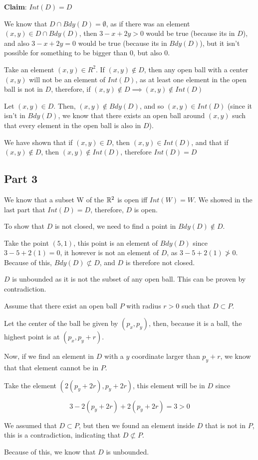 \documentclass[12pt]{article} %
\begin{document}
\begin{homeworkProblem}
    \textbf{Claim}: $Int(D) = D$



    We know that $D \cap Bdy(D) = \emptyset$, as if there was an element $(x, y) \in D \cap Bdy(D)$, then
    $3 - x + 2y > 0$ would be true (because its in $D$), and also $3 - x + 2y = 0$ would be true (because its in $Bdy(D)$),
    but it isn't possible for something to be bigger than 0, but also 0.

    Take an element $(x, y) \in R^2$. If $(x, y) \not \in D$, then any open ball
    with a center $(x, y)$ will not be an element of $Int(D)$, as at least one element in the open ball
    is not in $D$, therefore, if $(x, y) \not \in D \implies (x, y) \not \in Int(D)$

    Let $(x, y) \in D$. Then, $(x, y) \not \in Bdy(D)$, and so $(x, y) \in Int(D)$ (since it isn't in $Bdy(D)$, we know that there exists an open ball around $(x, y)$ such that every element in the open ball is also in $D$).

    We have shown that if $(x, y) \in D$, then $(x, y) \in Int(D)$, and that if $(x, y) \not \in D$, then $(x, y) \not \in Int(D)$, therefore $Int(D) = D$

    \subsection*{Part 3}

    We know that a subset W of the $\mathbb{R}^2$ is open iff $Int(W) = W$. We showed in the last part that $Int(D) = D$, therefore, $D$ is open.

    To show that $D$ is not closed, we need to find a point in $Bdy(D) \not \in D$.

    Take the point $(5, 1)$, this point is an element of $Bdy(D)$ since $3 - 5 + 2(1) = 0$, it however is not an element of
    $D$, as $3 - 5 + 2(1) \not > 0$. Because of this, $Bdy(D) \not \subset D$, and $D$ is therefore not closed.

    $D$ is unbounded as it is not the subset of any open ball. This can be proven by contradiction.

    Assume that there exist an open ball $P$ with radius $r > 0$ such that $D \subset P$.

    Let the center of the ball be given by $(p_x, p_y)$, then, because it is a ball, the highest point is at $(p_x, p_y + r)$.

    Now, if we find an element in $D$ with a $y$ coordinate larger than $p_y + r$, we know that that element cannot be in $P$.

    Take the element $(2(p_y + 2r), p_y + 2r)$, this element will be in $D$ since

    $$
        3 - 2(p_y + 2r) + 2(p_y + 2r) = 3 > 0
    $$

    We assumed that $D \subset P$, but then we found an element inside $D$ that is not in $P$, this is a contradiction, indicating that $D \not \subset P$.

    Because of this, we know that $D$ is unbounded.


\end{homeworkProblem}
\end{document}
